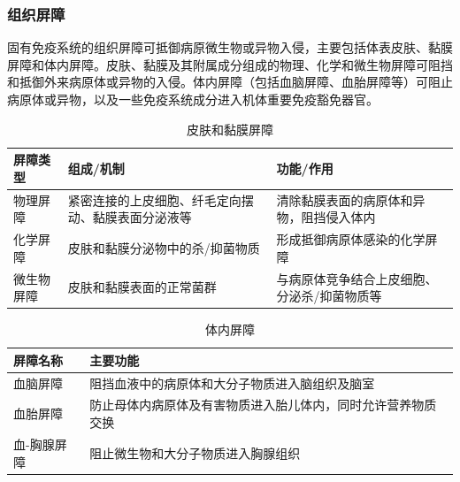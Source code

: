 \documentclass[9pt,a4paper,twoside]{rho-class/rho}
\begin{document}
    \subsubsection{组织屏障}

    固有免疫系统的组织屏障可抵御病原微生物或异物入侵，主要包括体表皮肤、黏膜屏障和体内屏障。皮肤、黏膜及其附属成分组成的物理、化学和微生物屏障可阻挡和抵御外来病原体或异物的入侵。体内屏障（包括血脑屏障、血胎屏障等）可阻止病原体或异物，以及一些免疫系统成分进入机体重要免疫豁免器官。

        \begin{table}[H]
            \centering
            \caption{皮肤和黏膜屏障}
            \label{tab:skin_mucosa_barrier}
            \begin{tabular}{@{}lll@{}}
            \toprule
            \textbf{屏障类型} & \textbf{组成/机制} & \textbf{功能/作用} \\
            \midrule
            物理屏障 & 紧密连接的上皮细胞、纤毛定向摆动、黏膜表面分泌液等 & 清除黏膜表面的病原体和异物，阻挡侵入体内 \\
            \midrule
            化学屏障 & 皮肤和黏膜分泌物中的杀/抑菌物质 & 形成抵御病原体感染的化学屏障 \\
            \midrule
            微生物屏障 & 皮肤和黏膜表面的正常菌群 & 与病原体竞争结合上皮细胞、分泌杀/抑菌物质等 \\
            \bottomrule
            \end{tabular}
        \end{table}
        
        \begin{table}[H]
            \centering
            \caption{体内屏障}
            \label{tab:internal_barrier}
            \begin{tabular}{@{}ll@{}}
            \toprule
            \textbf{屏障名称} & \textbf{主要功能} \\
            \midrule
            血脑屏障 & 阻挡血液中的病原体和大分子物质进入脑组织及脑室 \\
            \midrule
            血胎屏障 & 防止母体内病原体及有害物质进入胎儿体内，同时允许营养物质交换 \\
            \midrule
            血-胸腺屏障 & 阻止微生物和大分子物质进入胸腺组织 \\
            \bottomrule
            \end{tabular}
        \end{table}
\end{document}
